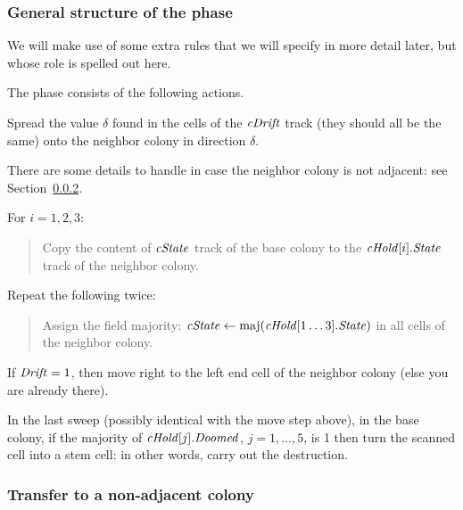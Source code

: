 \documentclass[12pt]{memoir}
\newcommand{\fld}[1]{\ensuremath{\textit{#1\/}}}
\newcommand{\maj}{\mathrm{maj}}
\newcommand{\Drift}{\fld{Drift}}
\newcommand{\Doomed}{\fld{Doomed}}
\newcommand{\cDrift}{\fld{cDrift}}
\newcommand{\cHold}{\fld{cHold}}
\newcommand{\State}{\fld{State}}
\newcommand{\cState}{\fld{cState}}
\begin{document}
\subsubsection{General structure of the phase}\label{sec:TransferPhase.general-struc}

We will make use of some extra rules that we will
specify in more detail later, but whose role is spelled out here.

The phase consists of the following actions.
\begin{enumerate}
\item
  Spread the value \( \delta \) found in the cells of the \( \cDrift \) track
  (they should all be the same)
  onto the neighbor colony in direction \( \delta \).

There are some details to handle in case the neighbor colony is not adjacent:
see Section~\ref{sec:adjacency}.

\item\label{i:transfer-state} For \( i=1,2,3 \):
        \begin{quote}
          Copy the content of \( \cState \) track of the base colony
            to the \( \cHold[i].\State \) track of the neighbor colony.
        \end{quote}

\item Repeat the following twice:
  \begin{quote}
 Assign the field majority: \( \cState\gets \maj(\cHold[1 \dots  3].\State) \)
in all cells of the neighbor colony.    
  \end{quote}
  
\item If \( \Drift = 1 \), then move right to the left end cell of the neighbor colony
(else you are already there).

        \begin{sloppypar}
          \item In the last sweep (possibly identical with the move step above), 
            in the base colony, if the majority of \( \cHold[j].\Doomed \), \( j=1,\dots,5 \), 
            is 1 then turn the scanned cell into a stem cell: 
            in other words, carry out the destruction.
          \end{sloppypar}


\end{enumerate}

\subsubsection{Transfer to a non-adjacent colony}\label{sec:adjacency}
\end{document}
